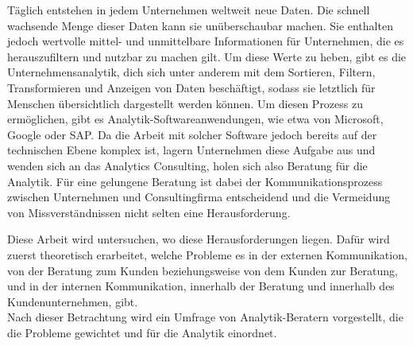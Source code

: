 \documentclass[../main.tex]{subfiles}
\begin{document}
Täglich entstehen in jedem Unternehmen weltweit neue Daten.
Die schnell wachsende Menge dieser Daten kann sie unüberschaubar machen. Sie enthalten jedoch wertvolle mittel- und unmittelbare Informationen für Unternehmen, die es herauszufiltern und nutzbar zu machen gilt.
Um diese Werte zu heben, gibt es die Unternehmensanalytik, dich sich unter anderem mit dem Sortieren, Filtern, Transformieren und Anzeigen von Daten beschäftigt, sodass sie letztlich für Menschen übersichtlich dargestellt werden können.
Um diesen Prozess zu ermöglichen, gibt es Analytik-Softwareanwendungen, wie etwa von Microsoft, Google oder SAP.
Da die Arbeit mit solcher Software jedoch bereits auf der technischen Ebene komplex ist, lagern Unternehmen diese Aufgabe aus und wenden sich an das Analytics Consulting, holen sich also Beratung für die Analytik.
Für eine gelungene Beratung ist dabei der Kommunikationsprozess zwischen Unternehmen und Consultingfirma entscheidend und die Vermeidung von Missverständnissen nicht selten eine Herausforderung.
 
Diese Arbeit wird untersuchen, wo diese Herausforderungen liegen.
Dafür wird zuerst theoretisch erarbeitet, welche Probleme es in der externen Kommunikation, von der Beratung zum Kunden beziehungsweise von dem Kunden zur Beratung, und in der internen Kommunikation, innerhalb der Beratung und innerhalb des Kundenunternehmen, gibt. 
\\
Nach dieser Betrachtung wird ein Umfrage von Analytik-Beratern vorgestellt, die die Probleme gewichtet und für die Analytik einordnet.
\end{document}

